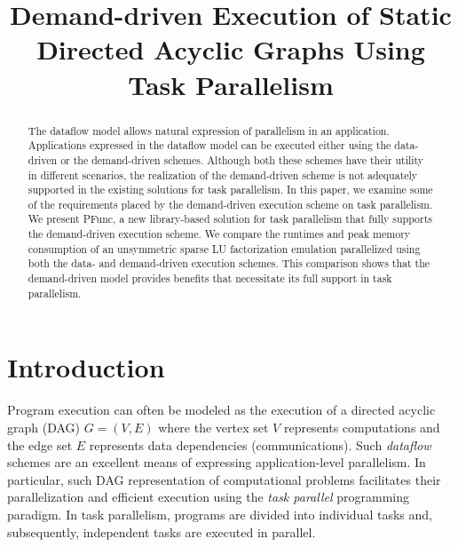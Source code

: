 \documentclass[10pt,conference]{IEEEtran}
\begin{document}
\title{Demand-driven Execution of Static Directed Acyclic Graphs 
       Using Task Parallelism}
\author{
}
\date{}
\maketitle

\begin{abstract}
The dataflow model allows natural expression of parallelism in an application.
Applications expressed in the dataflow model can be executed either using the
data-driven or the demand-driven schemes. Although both these schemes have
their utility in different scenarios, the realization of the demand-driven
scheme is not adequately supported in the existing solutions for task
parallelism. In this paper, we examine some of the requirements placed by the
demand-driven execution scheme on task parallelism. We present PFunc, a new
library-based solution for task parallelism that fully supports the
demand-driven execution scheme. We compare the runtimes and peak memory
consumption of an unsymmetric sparse LU factorization emulation parallelized
using both the data- and demand-driven execution schemes. This comparison shows
that the demand-driven model provides benefits that necessitate its full
support in task parallelism.
\end{abstract}

\section{Introduction}
Program execution can often 
be modeled as the execution of a directed acyclic graph
(DAG) $G=(V,E)$ where the vertex set $V$ represents computations and the edge
set $E$ represents data dependencies (communications). Such \emph{dataflow}
schemes are an excellent means of expressing  application-level parallelism.
In particular, such DAG representation of computational problems facilitates
their parallelization and efficient execution using the \textit{task parallel}
programming paradigm.  In task parallelism, programs are divided into individual 
tasks and, subsequently, independent tasks are executed in parallel.
\end{document}
